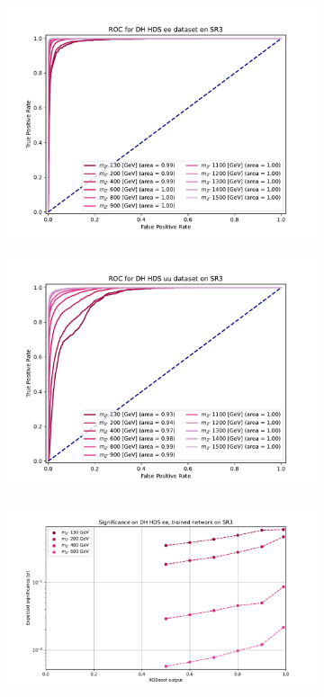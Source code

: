\documentclass[12pt, a4paper]{book}
\begin{document}
\begin{figure}[!ht]
\begin{subfigure}[b]{0.49\textwidth}
      \includegraphics[width=1\textwidth]{XGBoost/Model_independent/150/DH_HDS/ROC_ee.pdf}
   \end{subfigure}
   \hfill
   \begin{subfigure}[b]{0.49\textwidth}
      \centering
      \includegraphics[width=1\textwidth]{XGBoost/Model_independent/150/DH_HDS/ROC_uu.pdf}
   \end{subfigure}
   \hfill
	\begin{subfigure}[b]{0.49\textwidth}
      \centering
      \includegraphics[width=1\textwidth]{XGBoost/Model_independent/150/DH_HDS/EXP_SIG_ee.pdf}

\end{subfigure}
\end{figure}
\end{document}
